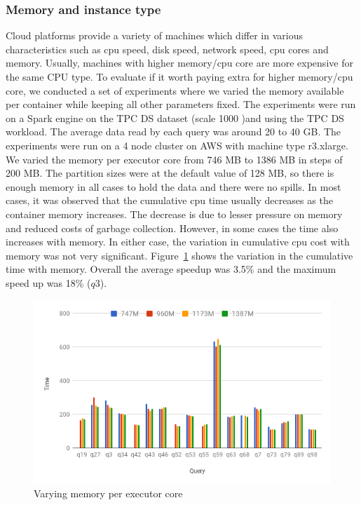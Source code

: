 \noindent\subsubsection*{Memory and instance type}
Cloud platforms provide a variety of machines which differ in various characteristics such as cpu speed, disk speed, network speed, cpu cores and memory. Usually, machines with higher memory/cpu core are more expensive for the same CPU type. To evaluate if it worth paying extra for higher memory/cpu core, we conducted a set of experiments where we varied the memory available per container while keeping all other parameters fixed. The experiments were run on a Spark engine on the TPC DS dataset (scale 1000 )and using the TPC DS workload. The average data read by each query was around 20 to 40 GB. The experiments were run on a 4 node cluster on AWS with machine type r3.xlarge. We varied the memory per executor core from 746 MB to 1386 MB in steps of 200 MB. The partition sizes were at the default value of 128 MB, so there is enough memory in all cases to hold the data and there were no spills. In most cases, it was observed that the cumulative cpu time usually decreases as the container memory increases. The decrease is due to lesser pressure on memory and reduced costs of garbage collection. However, in some cases the time also increases with memory. In either case, the variation in cumulative cpu cost with memory was not very significant. Figure~\ref{fig:varymem} shows the variation in the cumulative time with memory. Overall the average speedup was 3.5\% and the maximum speed up was 18\% ($q3$). 

\begin{figure}[h]
	\includegraphics[width=\linewidth]{fig/varymem.png}
	\caption{Varying memory per executor core}
	\label{fig:varymem}
\end{figure}

